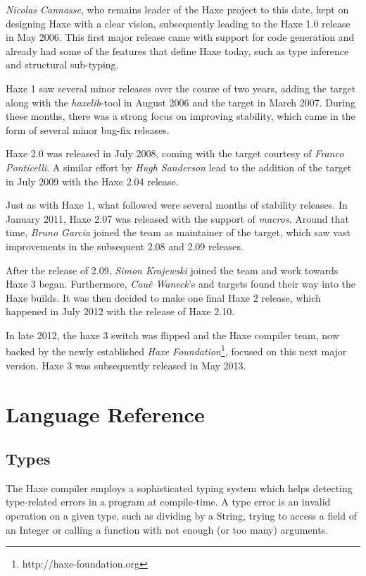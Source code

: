 \documentclass{haxe}
\begin{document}
\emph{Nicolas Cannasse}, who remains leader of the Haxe project to this date, kept on designing Haxe with a clear vision, subsequently leading to the Haxe 1.0 release in May 2006. This first major release came with support for  code generation and already had some of the features that define Haxe today, such as type inference and structural sub-typing.

Haxe 1 saw several minor releases over the course of two years, adding the  target along with the \emph{haxelib}-tool in August 2006 and the  target in March 2007. During these months, there was a strong focus on improving stability, which came in the form of several minor bug-fix releases.

Haxe 2.0 was released in July 2008, coming with the  target courtesy of \emph{Franco Ponticelli}. A similar effort by \emph{Hugh Sanderson} lead to the addition of the  target in July 2009 with the Haxe 2.04 release.

Just as with Haxe 1, what followed were several months of stability releases. In January 2011, Haxe 2.07 was released with the support of \emph{macros}. Around that time, \emph{Bruno Garcia} joined the team as maintainer of the  target, which saw vast improvements in the subsequent 2.08 and 2.09 releases.

After the release of 2.09, \emph{Simon Krajewski} joined the team and work towards Haxe 3 began. Furthermore, \emph{Cau\^{e} Waneck}'s  and  targets found their way into the Haxe builds. It was then decided to make one final Haxe 2 release, which happened in July 2012 with the release of Haxe 2.10.

In late 2012, the haxe 3 switch was flipped and the Haxe compiler team, now backed by the newly established \emph{Haxe Foundation}\footnote{http://haxe-foundation.org}, focused on this next major version. Haxe 3 was subsequently released in May 2013.

\part{Language Reference}

\chapter{Types}
\label{types}

The Haxe compiler employs a sophisticated typing system which helps detecting type-related errors in a program at compile-time. A type error is an invalid operation on a given type, such as dividing by a String, trying to access a field of an Integer or calling a function with not enough (or too many) arguments.
\end{document}
